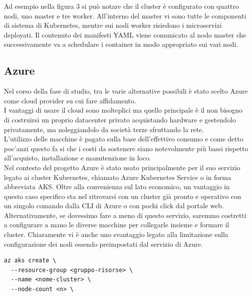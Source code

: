 \documentclass[a4paper,12pt]{report}
\begin{document}
Ad esempio nella figura 3 si può notare che il cluster è configurato con quattro nodi, uno master e tre worker. All'interno del master vi sono tutte le componenti di sistema di Kubernetes, mentre sui nodi worker risiedono i microservizi deployati. Il contenuto dei manifesti YAML viene comunicato al nodo master che successivamente va a schedulare i container in modo appropriato sui vari nodi.

\subsection{Azure}
Nel corso della fase di studio, tra le varie alternative possibili è stato scelto Azure come cloud provider su cui fare affidamento.\\
I vantaggi di usare il cloud sono molteplici ma quello principale è il non bisogno di costruirsi un proprio datacenter privato acquistando hardware e gestendolo privatamente, ma noleggiandolo da società terze sfruttando la rete.\cite{cloud}\\
L'utilizzo delle macchine è pagato sulla base dell'effettivo consumo e come detto poc'anzi questo fa si che i costi da sostenere siano notevolmente più bassi rispetto all'acquisto, installazione e manutenzione in loco.\\
Nel contesto del progetto Azure è stato usato principalmente per il suo servizio legato ai cluster Kubernetes, chiamato Azure Kubernetes Service o in forma abbreviata AKS. Oltre alla convenienza sul lato economico, un vantaggio in questo caso specifico sta nel ritrovarsi con un cluster già pronto e operativo con un singolo comando dalla CLI di Azure o con pochi click dal portale web.\\
Alternativamente, se dovessimo fare a meno di questo servizio, saremmo costretti a configurare a mano le diverse macchine per collegarle insieme e formare il cluster. Chiaramente vi è anche uno svantaggio legato alla limitazione sulla configurazione dei nodi essendo preimpostati dal servizio di Azure.
\begin{lstlisting}[caption={\\\textit{Esempio di comando per creare un cluster Kubernetes come servizio di Azure da Azure CLI. Gli argomenti passati sono il gruppo risorse in cui deployare la risorsa di tipo AKS, il nome attribuito al cluster e il numero di nodi desiderati.}}]
az aks create \
  --resource-group <gruppo-risorse> \
  --name <nome-cluster> \
  --node-count <n> \
\end{lstlisting}
\end{document}
